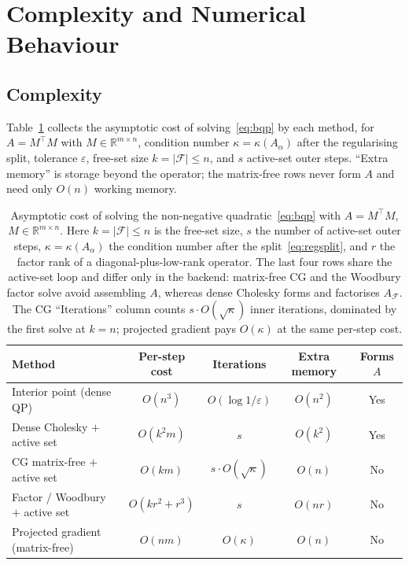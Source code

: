 \section{Complexity and Numerical Behaviour}\label{sec:results}

\subsection{Complexity}\label{ssec:complexity}

Table~\ref{tab:complexity} collects the asymptotic cost of solving~\eqref{eq:bqp} by each
method, for $A = M^\top M$ with $M \in \mathbb{R}^{m\times n}$, condition number
$\kappa = \kappa(A_\alpha)$ after the regularising split, tolerance $\varepsilon$, free-set
size $k = |\mathcal{F}| \leq n$, and $s$ active-set outer steps. ``Extra memory'' is storage
beyond the operator; the matrix-free rows never form $A$ and need only $O(n)$ working memory.

\begin{table}[ht]
\centering
\footnotesize
\begin{tabular}{lcccc}
\toprule
Method & Per-step cost & Iterations & Extra memory & Forms $A$ \\
\midrule
Interior point (dense QP)          & $O(n^3)$        & $O(\log 1/\varepsilon)$          & $O(n^2)$ & Yes \\
Dense Cholesky $+$ active set       & $O(k^2 m)$      & $s$                             & $O(k^2)$ & Yes \\
CG matrix-free $+$ active set        & $O(km)$         & $s \cdot O(\sqrt\kappa)$        & $O(n)$   & No  \\
Factor / Woodbury $+$ active set     & $O(kr^2 + r^3)$ & $s$                             & $O(nr)$  & No  \\
Projected gradient (matrix-free)     & $O(nm)$         & $O(\kappa)$                     & $O(n)$   & No  \\
\bottomrule
\end{tabular}
\caption{Asymptotic cost of solving the non-negative quadratic~\eqref{eq:bqp} with
$A = M^\top M$, $M \in \mathbb{R}^{m \times n}$. Here $k = |\mathcal{F}| \leq n$ is the
free-set size, $s$ the number of active-set outer steps, $\kappa = \kappa(A_\alpha)$ the
condition number after the split~\eqref{eq:regsplit}, and $r$ the factor rank of a
diagonal-plus-low-rank operator. The last four rows share the active-set loop and differ only
in the backend: matrix-free CG and the Woodbury factor solve avoid assembling $A$, whereas
dense Cholesky forms and factorises $A_{\mathcal{F}}$. The CG ``Iterations'' column counts
$s \cdot O(\sqrt\kappa)$ inner iterations, dominated by the first solve at $k = n$; projected
gradient pays $O(\kappa)$ at the same per-step cost.}
\label{tab:complexity}
\end{table}

